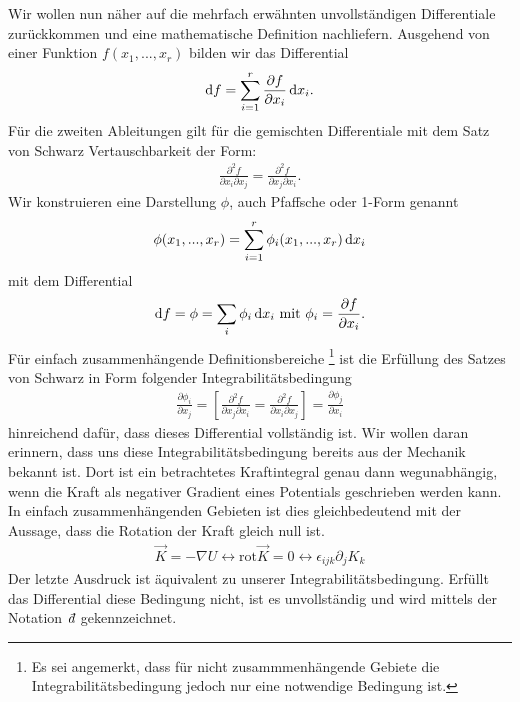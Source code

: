 Wir wollen nun näher auf die mehrfach erwähnten unvollständigen Differentiale zurückkommen und eine mathematische Definition nachliefern. Ausgehend von einer Funktion $f(x_1,...,x_r)$ bilden wir das Differential 
\begin{align}
    \label{eq:erster_HS_TD}
    \mathop{}\!\mathrm{d} f = \sum_{i=1}^r \frac{\partial f}{\partial x_i} \mathop{}\!\mathrm{d} x_i.
\end{align}
Für die zweiten Ableitungen gilt für die gemischten Differentiale mit dem Satz von Schwarz Vertauschbarkeit der Form:
\begin{align}
    \frac{\partial ^2 f}{\partial x_i \partial x_j} = \frac{\partial ^2 f}{\partial x_j \partial x_i}.
\end{align}
Wir konstruieren eine Darstellung $\phi$, auch Pfaffsche oder 1-Form genannt
\begin{align}
    \phi (x_1,...,x_r)=\sum _{i=1}^r \phi_i(x_1,...,x_r)\mathop{}\!\mathrm{d} x_i
\end{align}
mit dem Differential 
\begin{align}
    \mathop{}\!\mathrm{d} f = \phi = \sum_i \phi_i \mathop{}\!\mathrm{d} x_i \text{ mit } \phi_i = \frac{\partial f}{\partial x_i}. 
\end{align}
Für einfach zusammenhängende Definitionsbereiche \footnote[5]{Es sei angemerkt, dass für nicht zusammmenhängende Gebiete die Integrabilitätsbedingung jedoch nur eine notwendige Bedingung ist.} ist die Erfüllung des Satzes von Schwarz in Form folgender Integrabilitätsbedingung
\begin{align}
    \frac{\partial \phi_i}{\partial x_j}= [\frac{\partial^2f}{\partial x_j\partial x_i}=\frac{\partial^2f}{\partial x_i\partial x_j}]=\frac{\partial \phi_j}{\partial x_i}
\end{align}
hinreichend dafür, dass dieses Differential vollständig ist. 
Wir wollen daran erinnern, dass uns diese Integrabilitätsbedingung bereits aus der Mechanik bekannt ist. Dort ist ein betrachtetes Kraftintegral genau dann wegunabhängig, wenn die Kraft als negativer Gradient eines Potentials geschrieben werden kann. In einfach zusammenhängenden Gebieten ist dies gleichbedeutend mit der Aussage, dass die Rotation der Kraft gleich null ist.
\begin{align}
    \vec{K}=-\nabla U \leftrightarrow \text{rot}\vec{K}=0 \leftrightarrow \epsilon_{ijk}\partial_jK_k
\end{align} 
Der letzte Ausdruck ist äquivalent zu unserer Integrabilitätsbedingung.
Erfüllt das Differential diese Bedingung nicht, ist es unvollständig und wird mittels der Notation $\udiff$ gekennzeichnet.
